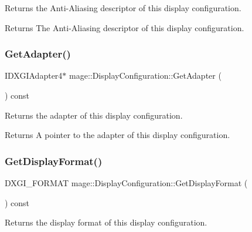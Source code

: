 Returns the Anti-\/\+Aliasing descriptor of this display configuration.

\begin{DoxyReturn}{Returns}
The Anti-\/\+Aliasing descriptor of this display configuration. 
\end{DoxyReturn}
\hypertarget{structmage_1_1_display_configuration_a49389d3025f99de828dd3d4d785c6f30}{}\label{structmage_1_1_display_configuration_a49389d3025f99de828dd3d4d785c6f30} 
\subsubsection{\texorpdfstring{Get\+Adapter()}{GetAdapter()}}
{\footnotesize\ttfamily I\+D\+X\+G\+I\+Adapter4$\ast$ mage\+::\+Display\+Configuration\+::\+Get\+Adapter (\begin{DoxyParamCaption}{ }\end{DoxyParamCaption}) const\hspace{0.3cm}{\ttfamily [noexcept]}}

Returns the adapter of this display configuration.

\begin{DoxyReturn}{Returns}
A pointer to the adapter of this display configuration. 
\end{DoxyReturn}
\hypertarget{structmage_1_1_display_configuration_a412215b18edac3ec6bf18cd00d8c689b}{}\label{structmage_1_1_display_configuration_a412215b18edac3ec6bf18cd00d8c689b} 
\subsubsection{\texorpdfstring{Get\+Display\+Format()}{GetDisplayFormat()}}
{\footnotesize\ttfamily D\+X\+G\+I\+\_\+\+F\+O\+R\+M\+AT mage\+::\+Display\+Configuration\+::\+Get\+Display\+Format (\begin{DoxyParamCaption}{ }\end{DoxyParamCaption}) const\hspace{0.3cm}{\ttfamily [noexcept]}}

Returns the display format of this display configuration.

